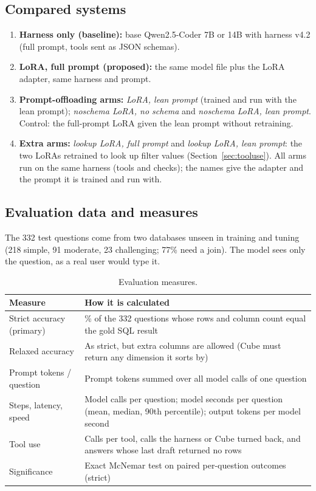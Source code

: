 \subsection{Compared systems}
\begin{enumerate}
  \item \textbf{Harness only (baseline):} base Qwen2.5-Coder 7B or 14B with harness v4.2 (full prompt, tools sent as JSON schemas).
  \item \textbf{LoRA, full prompt (proposed):} the same model file plus the LoRA adapter, same harness and prompt.
  \item \textbf{Prompt-offloading arms:} \emph{LoRA, lean prompt} (trained and run with the lean prompt); \emph{noschema LoRA, no schema} and \emph{noschema LoRA, lean prompt}. Control: the full-prompt LoRA given the lean prompt without retraining.
  \item \textbf{Extra arms:} \emph{lookup LoRA, full prompt} and \emph{lookup LoRA, lean prompt}: the two LoRAs retrained to look up filter values (Section~\ref{sec:tooluse}).
  All arms run on the same harness (tools and checks); the names give the adapter and the prompt it is trained and run with.
\end{enumerate}

\subsection{Evaluation data and measures}
The 332 test questions come from two databases unseen in training and tuning (218 simple, 91 moderate, 23 challenging; 77\% need a join). The model sees only the question, as a real user would type it.

\begin{table}[!htbp]
\centering
\small
\caption{Evaluation measures.}
\begin{tabularx}{\linewidth}{@{}l>{\raggedright\arraybackslash}X@{}}
\toprule
\textbf{Measure} & \textbf{How it is calculated}\\
\midrule
Strict accuracy (primary) & \% of the 332 questions whose rows and column count equal the gold SQL result\\
Relaxed accuracy & As strict, but extra columns are allowed (Cube must return any dimension it sorts by)\\
Prompt tokens / question & Prompt tokens summed over all model calls of one question\\
Steps, latency, speed & Model calls per question; model seconds per question (mean, median, 90th percentile); output tokens per model second\\
Tool use & Calls per tool, calls the harness or Cube turned back, and answers whose last draft returned no rows\\
Significance & Exact McNemar test on paired per-question outcomes (strict)\\
\bottomrule
\end{tabularx}
\end{table}

